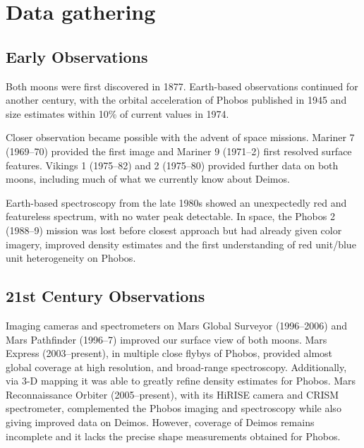\newpage
\appendix
\appendixpage

\section{Data gathering}\label{appendix:obs}

\subsection{Early Observations}

Both moons were first discovered in 1877. Earth-based observations continued for another century, with the orbital acceleration of Phobos published in 1945 and size estimates within 10\% of current values in 1974.

Closer observation became possible with the advent of space missions. Mariner 7 (1969--70) provided the first image and Mariner 9 (1971--2) first resolved surface features. Vikings 1 (1975--82) and 2 (1975--80) provided further data on both moons, including much of what we currently know about Deimos. 

Earth-based spectroscopy from the late 1980s showed an unexpectedly red and featureless spectrum, with no water peak detectable. In space, the Phobos 2 (1988--9) mission was lost before closest approach but had already given color imagery, improved density estimates and the first understanding of red unit/blue unit heterogeneity on Phobos. 


\subsection{21st Century Observations}

Imaging cameras and spectrometers on Mars Global Surveyor (1996--2006) and Mars Pathfinder (1996--7) improved our surface view of both moons. Mars Express (2003--present), in multiple close flybys of Phobos, provided almost global coverage at high resolution, and broad-range spectroscopy. Additionally, via 3-D mapping it was able to greatly refine density estimates for Phobos. Mars Reconnaissance Orbiter (2005--present), with its HiRISE camera and CRISM spectrometer, complemented the Phobos imaging and spectroscopy while also giving improved data on Deimos. However, coverage of Deimos remains incomplete and it lacks the precise shape measurements obtained for Phobos.

